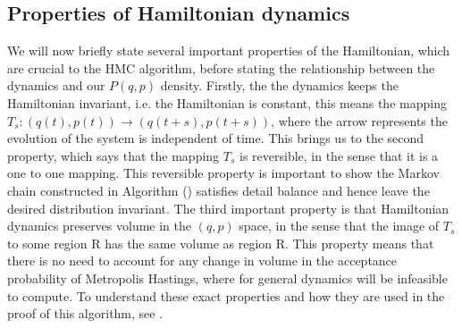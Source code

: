\documentclass[11pt]{article}
\begin{document}
\subsection{Properties of Hamiltonian dynamics}
We will now briefly state several important properties of the Hamiltonian, which are crucial to the HMC algorithm, before stating the relationship between the dynamics and our $P(q,p)$ density. Firstly, the the dynamics keeps the Hamiltonian invariant, i.e. the Hamiltonian is constant, this means the mapping $T_s: (q(t),p(t)) \rightarrow (q(t+s),p(t+s))$, where the arrow represents the evolution of the system is independent of time. This brings us to the second property, which says that the mapping $T_s$ is reversible, in the sense that it is a one to one mapping. This reversible property is important to show the Markov chain constructed in Algorithm () satisfies detail balance and hence leave the desired distribution invariant. The third important property is that Hamiltonian dynamics preserves volume in the $(q,p)$ space, in the sense that the image of $T_s$ to some region R has the same volume as region R. This property means that there is no need to account for any change in volume in the acceptance probability of Metropolis Hastings, where for general dynamics will be infeasible to compute. To understand these exact properties and how they are used in the proof of this algorithm, see .
\end{document}
